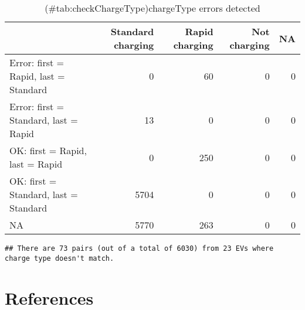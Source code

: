 \documentclass[]{article}
\newenvironment{Shaded}{\begin{snugshade}}{\end{snugshade}}
\newcommand{\DecValTok}[1]{\textcolor[rgb]{0.00,0.00,0.81}{#1}}
\newcommand{\KeywordTok}[1]{\textcolor[rgb]{0.13,0.29,0.53}{\textbf{#1}}}
\newcommand{\NormalTok}[1]{#1}
\newcommand{\OperatorTok}[1]{\textcolor[rgb]{0.81,0.36,0.00}{\textbf{#1}}}
\newcommand{\StringTok}[1]{\textcolor[rgb]{0.31,0.60,0.02}{#1}}
\begin{document}
\begin{table}[t]

\caption{(\#tab:checkChargeType)chargeType errors detected}
\centering
\begin{tabular}{l|r|r|r|r}
\hline
  & Standard charging & Rapid charging & Not charging & NA\\
\hline
Error: first = Rapid, last = Standard & 0 & 60 & 0 & 0\\
\hline
Error: first = Standard, last = Rapid & 13 & 0 & 0 & 0\\
\hline
OK: first = Rapid, last = Rapid & 0 & 250 & 0 & 0\\
\hline
OK: first = Standard, last = Standard & 5704 & 0 & 0 & 0\\
\hline
NA & 5770 & 263 & 0 & 0\\
\hline
\end{tabular}
\end{table}

\begin{Shaded}
\end{Shaded}

\begin{verbatim}
## There are 73 pairs (out of a total of 6030) from 23 EVs where charge type doesn't match.
\end{verbatim}

\hypertarget{references}{%
\section{References}\label{references}}
\end{document}
